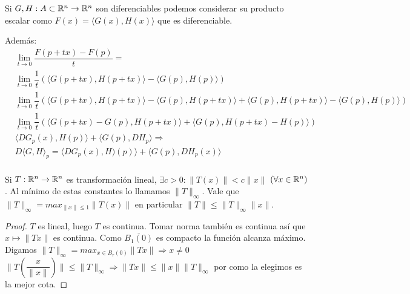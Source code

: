 \begin{note}
  Si \(G, H: A \subset \mathbb{R}^n \to \mathbb{R}^n\) son diferenciables podemos considerar su producto escalar como \(F(x) = \langle G(x), H(x) \rangle\) que es diferenciable.

  Además:
  \begin{align*}
     & \lim_{t \to 0} \dfrac{F(p + tx) - F(p)}{t} =                                                                                                                 \\
     & \lim_{t \to 0} \dfrac{1}{t} ( \langle G(p + tx), H(p+tx) \rangle - \langle G(p), H(p) \rangle )                                                              \\
     & \lim_{t \to 0} \dfrac{1}{t} ( \langle G(p+tx), H(p+tx) \rangle - \langle G(p), H(p+tx) \rangle + \langle G(p), H(p+tx) \rangle - \langle G(p), H(p) \rangle) \\
     & \lim_{t \to 0} \dfrac{1}{t} (\langle G(p+tx) - G(p), H(p + tx) \rangle + \langle G(p), H(p+tx) - H(p) \rangle)                                               \\
     & \langle DG_p(x), H(p) \rangle + \langle G(p), DH_p \rangle \Rightarrow                                                                                       \\
     & D\langle G, H \rangle_p = \langle DG_p(x), H)(p) \rangle + \langle G(p), DH_p(x) \rangle                                                                     \\
  \end{align*}
\end{note}

\begin{lemma}
  Si \(T: \mathbb{R}^n \to \mathbb{R}^n\) es transformación lineal, \(\exists c > 0: \|T(x)\| < c \|x\|\) \((\forall x \in \mathbb{R}^n)\). Al mínimo de estas constantes lo llamamos \(\|T\|_{\infty}\). Vale que \(\|T\|_{\infty} = max_{\|x\| \leq 1} \|T(x)\|\) en particular
  \(\|T\| \leq \|T\|_{\infty} \|x\|\).
  \begin{proof}
    \(T\) es lineal, luego \(T\) es continua. Tomar norma también es continua así que \(x \mapsto \|Tx\|\) es continua. Como \(\overline{B_1(0)}\) es compacto la función alcanza máximo. Digamos \(\|T\|_{\infty} = max_{x \in B_r(0)} \|Tx\| \Rightarrow x \neq 0\) \\
    \(\|T(\dfrac{x}{\|x\|})\| \leq \|T\|_{\infty} \Rightarrow \|Tx\| \leq \|x\| \|T\|_{\infty}\) por como la elegimos es la mejor cota.
  \end{proof}
\end{lemma}

